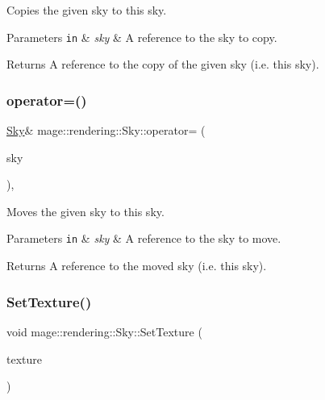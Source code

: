 Copies the given sky to this sky.


\begin{DoxyParams}[1]{Parameters}
\mbox{\tt in}  & {\em sky} & A reference to the sky to copy. \\
\hline
\end{DoxyParams}
\begin{DoxyReturn}{Returns}
A reference to the copy of the given sky (i.\+e. this sky). 
\end{DoxyReturn}
\hypertarget{classmage_1_1rendering_1_1_sky_a01b1145f77fdab81e7dce93f6a524b45}{}\label{classmage_1_1rendering_1_1_sky_a01b1145f77fdab81e7dce93f6a524b45} 
\subsubsection{\texorpdfstring{operator=()}{operator=()}\hspace{0.1cm}{\footnotesize\ttfamily [2/2]}}
{\footnotesize\ttfamily \hyperlink{classmage_1_1rendering_1_1_sky}{Sky}\& mage\+::rendering\+::\+Sky\+::operator= (\begin{DoxyParamCaption}\item[{\hyperlink{classmage_1_1rendering_1_1_sky}{Sky} \&\&}]{sky }\end{DoxyParamCaption})\hspace{0.3cm}{\ttfamily [default]}, {\ttfamily [noexcept]}}

Moves the given sky to this sky.


\begin{DoxyParams}[1]{Parameters}
\mbox{\tt in}  & {\em sky} & A reference to the sky to move. \\
\hline
\end{DoxyParams}
\begin{DoxyReturn}{Returns}
A reference to the moved sky (i.\+e. this sky). 
\end{DoxyReturn}
\hypertarget{classmage_1_1rendering_1_1_sky_aca571c68ad345801051fcc36e32013e6}{}\label{classmage_1_1rendering_1_1_sky_aca571c68ad345801051fcc36e32013e6} 
\subsubsection{\texorpdfstring{Set\+Texture()}{SetTexture()}}
{\footnotesize\ttfamily void mage\+::rendering\+::\+Sky\+::\+Set\+Texture (\begin{DoxyParamCaption}\item[{\hyperlink{namespacemage_1_1rendering_a6f3ae54f825328465b0cdde0f0de4a36}{Texture\+Ptr}}]{texture }\end{DoxyParamCaption})}

